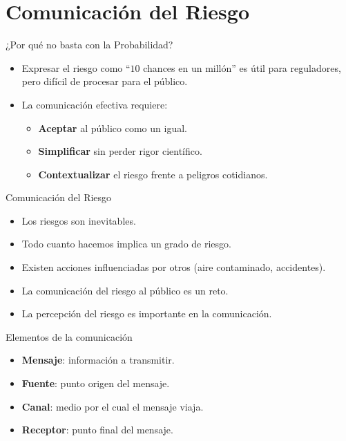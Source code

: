 \documentclass[10pt,compress]{beamer}
\begin{document}
\section{Comunicación del Riesgo}
\begin{frame}{¿Por qué no basta con la Probabilidad?}
    \begin{itemize}
        \item Expresar el riesgo como ``$10$ chances en un millón'' es útil para reguladores, pero difícil de procesar para el público.
        \item La comunicación efectiva requiere:
        \begin{itemize}
            \item \textbf{Aceptar} al público como un igual.
            \item \textbf{Simplificar} sin perder rigor científico.
            \item \textbf{Contextualizar} el riesgo frente a peligros cotidianos.
        \end{itemize}
    \end{itemize}
\end{frame}
\begin{frame}{Comunicación del Riesgo}
\begin{itemize}
\item Los riesgos son inevitables.
\item Todo cuanto hacemos implica un grado de riesgo.
\item Existen acciones influenciadas por otros (aire contaminado, accidentes).
\item La comunicación del riesgo al público es un reto.
\item La percepción del riesgo es importante en la comunicación.
\end{itemize}
\end{frame}

\begin{frame}{Elementos de la comunicación}
\begin{itemize}
\item \textbf{Mensaje}: información a transmitir.
\item \textbf{Fuente}: punto origen del mensaje.
\item \textbf{Canal}: medio por el cual el mensaje viaja.
\item \textbf{Receptor}: punto final del mensaje.
\end{itemize}
\end{frame}
\end{document}
